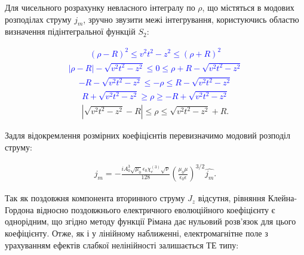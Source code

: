 Для чисельного розрахунку невласного інтегралу по $ \rho $, що містяться в 
модових розподілах струму $ j_m $, зручно звузити межі інтегрування, 
користуючись областю визначення підінтегральної функцій $ S_2 $:

\textcolor{blue} { \begin{equation*} \begin{aligned}
(\rho - R)^2 \leq v^2t^2 - z^2 \leq (\rho + R)^2
\end{aligned} \end{equation*} }
%
\textcolor{blue} { \begin{equation*} \begin{aligned}
| \rho - R | - \sqrt{v^2t^2 - z^2} \leq 0 \leq \rho + R - \sqrt{v^2t^2 - z^2}
\end{aligned} \end{equation*} }
%
\textcolor{blue} { \begin{equation*} \begin{aligned}
- R - \sqrt{v^2t^2 - z^2} \leq - \rho \leq R - \sqrt{v^2t^2 - z^2}
\end{aligned} \end{equation*} }
%
\textcolor{blue} { \begin{equation*} \begin{aligned}
R + \sqrt{v^2t^2 - z^2} \geq \rho \geq - R + \sqrt{v^2t^2 - z^2}
\end{aligned} \end{equation*} }
%
\begin{equation} \begin{aligned}
\left| \sqrt{v^2t^2 - z^2} - R \right| \leq \rho \leq \sqrt{v^2t^2 - z^2} + R.
\end{aligned} \end{equation}

Задля відокремлення розмірних коефіцієнтів перевизначимо модовий розподіл 
струму:

\begin{equation} \begin{aligned}
j_m = - \frac{i A_0^3 \sqrt{\mu_0} \epsilon_0 \chi_e^{(3)} \sqrt{\nu}}{128}
\left( \frac{\mu_0 \mu}{\epsilon_0 \epsilon} \right)^{3/2} \hat{j_m}.
\end{aligned} \end{equation}

Так як поздовжня компонента вторинного струму $ J_z $ відсутня, рівняння 
Клейна-Гордона відносно поздовжнього електричного еволюційного коефіцієнту 
є однорідним, що згідно методу функції Рімана дає нульовий розв'язок для
цього коефіцієнту. Отже, як і у лінійному наближенні, електромагнітне поле 
з урахуванням ефектів слабкої нелінійності залишається ТЕ типу:

